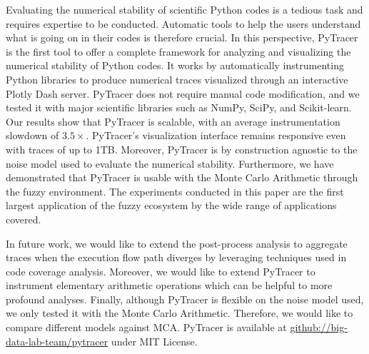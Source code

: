 \documentclass[11pt]{article}
\newcommand{\pytracer}[0]{PyTracer\xspace}
\begin{document}
Evaluating the numerical stability of scientific Python codes is a tedious task and requires expertise to be conducted. Automatic tools to help the users understand what is going on in their codes is therefore crucial.
In this perspective, \pytracer is the first tool to offer a complete framework for analyzing and visualizing the numerical stability of Python codes. It works by automatically instrumenting Python libraries to produce numerical traces visualized through an interactive Plotly Dash server. \pytracer does not require manual code modification, and we tested it with major scientific libraries such as NumPy, SciPy, and Scikit-learn. Our results show that \pytracer is scalable, with an average instrumentation slowdown of $3.5\times$. \pytracer's visualization interface remains responsive even with traces of up to 1TB. Moreover,
\pytracer is by construction agnostic to the noise model used to evaluate the numerical stability. Furthermore, we have demonstrated that \pytracer is usable with the Monte Carlo Arithmetic through the fuzzy environment. 
The experiments conducted in this paper are the first largest application of the fuzzy ecosystem by the wide range of applications covered. 

In future work, we would like to extend the post-process analysis to aggregate traces when the execution flow path diverges by leveraging techniques used in code coverage analysis. Moreover, we would like to extend \pytracer to instrument elementary arithmetic operations which can be helpful to more profound analyses. Finally, although \pytracer is flexible on the noise model used, we only tested it with the Monte Carlo Arithmetic. Therefore, we would like to compare different models against MCA. 
\pytracer is available at \href{https://github.com/big-data-lab-team/pytracer}{github://big-data-lab-team/pytracer} under MIT License.

\end{document}
